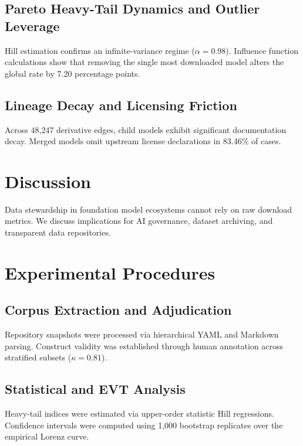 \documentclass[11pt,letterpaper]{article}
\begin{document}
\subsection*{Pareto Heavy-Tail Dynamics and Outlier Leverage}
Hill estimation confirms an infinite-variance regime ($\alpha = 0.98$). Influence function calculations show that removing the single most downloaded model alters the global rate by 7.20 percentage points.

\subsection*{Lineage Decay and Licensing Friction}
Across 48,247 derivative edges, child models exhibit significant documentation decay. Merged models omit upstream license declarations in 83.46\% of cases.

\section*{Discussion}
Data stewardship in foundation model ecosystems cannot rely on raw download metrics. We discuss implications for AI governance, dataset archiving, and transparent data repositories.

\section*{Experimental Procedures}
\subsection*{Corpus Extraction and Adjudication}
Repository snapshots were processed via hierarchical YAML and Markdown parsing. Construct validity was established through human annotation across stratified subsets ($\kappa = 0.81$).

\subsection*{Statistical and EVT Analysis}
Heavy-tail indices were estimated via upper-order statistic Hill regressions. Confidence intervals were computed using 1,000 bootstrap replicates over the empirical Lorenz curve.



\end{document}
